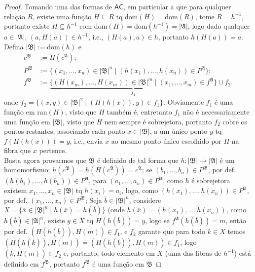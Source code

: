\documentclass[11pt]{article}
\newcommand{\mf}[1]{\mathfrak{#1}}
\newcommand{\msf}[1]{\mathsf{#1}}
\begin{document}
\begin{proof}
    Tomando uma das formas de $\msf{AC}$, em particular a que para qualquer relação $R$, existe uma função $H\subseteq R$ tq $\text{dom}(H)=\text{dom}(R)$, tome $R=h^{-1}$, portanto existe $H\subseteq h^{-1}$ com $\text{dom}(H)=\text{dom}(h^{-1})=|\mf{A}|$, logo dado qualquer $a\in|\mf{A}|$, $(a,H(a))\in h^{-1}$, i.e., $(H(a),a)\in h$, portanto $h(H(a))=a$. Defina $|\mf{B}|:=\text{dom}(h)$ e
    \begin{align*}
        c^\mf{B} & :=H(c^\mf{A});\\
        P^\mf{B} & :=\{(x_1,\dots,x_n)\in|\mf{B}|^n\mid (h(x_1),\dots,h(x_n))\in P^\mf{A}\};\\
        f^\mf{B} & :=\underbrace{\{(H(x_m),\dots,H(x_m))\in|\mf{B}|^m\mid (x_1,\dots,x_m)\in f^\mf{A}\}}_{f_1}\cup f_2.
    \end{align*}
    onde $f_2=\{(x,y)\in|\mf{B}|^2\mid (H(h(x)),y)\in f_1\}$. Obviamente $f_1$ é uma função em $\text{ran}(H)$, visto que $H$ também é, entretanto $f_1$ não é necessariamente uma função em $|\mf{B}|$, visto que $H$ nem sempre é sobrejetora, portanto $f_2$ cobre os pontos restantes, associando cada ponto $x\in|\mf{B}|$, a um único ponto $y$ tq $f(H(h(x)))=y$, i.e., envia $x$ ao mesmo ponto único escolhido por $H$ na fibra que $x$ pertence.\\
    Basta agora provarmos que $\mf{B}$ é definido de tal forma que $h:|\mf{B}|\to|\mf{A}|$ é um homomorfismo: $h(c^\mf{B})=h(H(c^\mf{A}))=c^\mf{A}$; se $(b_1,\dots,b_n)\in P^\mf{B}$, por def. $(h(b_1),\dots,h(b_n))\in P^\mf{A}$, para $(a_1,\dots,a_n)\in P^\mf{A}$, como $h$ é sobrejetora existem $x_1,\dots,x_n\in|\mf{B}|$ tq $h(x_i)=a_i$, logo, como $(h(x_1),\dots,h(x_n))\in P^\mf{A}$, por def. $(x_1,\dots,x_n)\in P^\mf{B}$; Seja $\overline{b}\in|\mf{B}|^n$, considere $X=\{\overline{x}\in|\mf{B}|^n\mid h(\overline{x})=h(\overline{b})\}$ (onde $h(\overline{x})=(h(x_1),\dots,h(x_n))$, como $h(\overline{b})\in|\mf{A}|^n$, existe $y\in X$ tq $H(h(\overline{b}))=y$, logo se $f^\mf{A}(h(\overline{b}))=m$, então por def. $(H(h(\overline{b})),H(m))\in f_1$, e $f_2$ garante que para todo $k\in X$ temos $(H(h(\overline{k})),H(m))=(H(h(\overline{b})),H(m))\in f_1$, logo $(\overline{k},H(m))\in f_2$ e, portanto, todo elemento em $X$ (uma das fibras de $h^{-1}$) está definido em $f^\mf{B}$, portanto $f^\mf{B}$ é uma função em $\mf{B}$
\end{proof}
\end{document}
